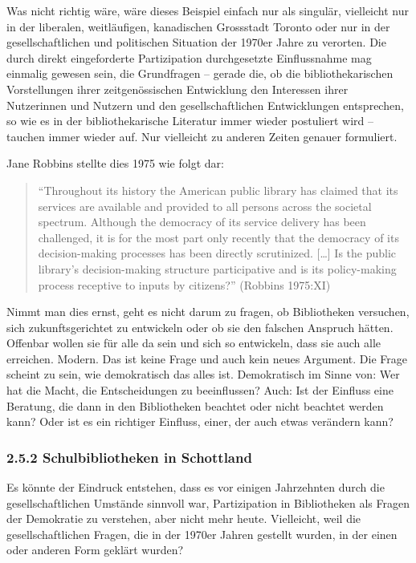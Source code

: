 \documentclass[a4paper,
fontsize=11pt,
oneside,
numbers=noperiodatend,
parskip=half-,
bibliography=totoc,
final
]{scrartcl}
\begin{document}
Was nicht richtig wäre, wäre dieses Beispiel einfach nur als singulär,
vielleicht nur in der liberalen, weitläufigen, kanadischen Grossstadt
Toronto oder nur in der gesellschaftlichen und politischen Situation der
1970er Jahre zu verorten. Die durch direkt eingeforderte Partizipation
durchgesetzte Einflussnahme mag einmalig gewesen sein, die Grundfragen
-- gerade die, ob die bibliothekarischen Vorstellungen ihrer
zeitgenössischen Entwicklung den Interessen ihrer Nutzerinnen und
Nutzern und den gesellschaftlichen Entwicklungen entsprechen, so wie es
in der bibliothekarische Literatur immer wieder postuliert wird --
tauchen immer wieder auf. Nur vielleicht zu anderen Zeiten genauer
formuliert.

Jane Robbins stellte dies 1975 wie folgt dar:

\begin{quote}
\enquote{Throughout its history the American public library has claimed
that its services are available and provided to all persons across the
societal spectrum. Although the democracy of its service delivery has
been challenged, it is for the most part only recently that the
democracy of its decision-making processes has been directly
scrutinized. {[}\ldots{}{]} Is the public library's decision-making
structure participative and is its policy-making process receptive to
inputs by citizens?} (Robbins 1975:XI)
\end{quote}

Nimmt man dies ernst, geht es nicht darum zu fragen, ob Bibliotheken
versuchen, sich zukunftsgerichtet zu entwickeln oder ob sie den falschen
Anspruch hätten. Offenbar wollen sie für alle da sein und sich so
entwickeln, dass sie auch alle erreichen. Modern. Das ist keine Frage
und auch kein neues Argument. Die Frage scheint zu sein, wie
demokratisch das alles ist. Demokratisch im Sinne von: Wer hat die
Macht, die Entscheidungen zu beeinflussen? Auch: Ist der Einfluss eine
Beratung, die dann in den Bibliotheken beachtet oder nicht beachtet
werden kann? Oder ist es ein richtiger Einfluss, einer, der auch etwas
verändern kann?

\hypertarget{schulbibliotheken-in-schottland}{%
\subsubsection{2.5.2 Schulbibliotheken in
Schottland}\label{schulbibliotheken-in-schottland}}

Es könnte der Eindruck entstehen, dass es vor einigen Jahrzehnten durch
die gesellschaftlichen Umstände sinnvoll war, Partizipation in
Bibliotheken als Fragen der Demokratie zu verstehen, aber nicht mehr
heute. Vielleicht, weil die gesellschaftlichen Fragen, die in der 1970er
Jahren gestellt wurden, in der einen oder anderen Form geklärt wurden?
\end{document}

